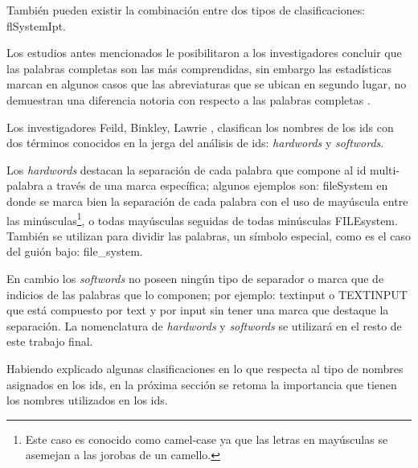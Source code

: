 También pueden existir la combinación entre dos tipos de clasificaciones: \textsf{flSystemIpt}.

Los estudios antes mencionados le posibilitaron a los investigadores concluir que las palabras completas son las más comprendidas, sin embargo las estadísticas marcan en algunos casos que las abreviaturas que se ubican en segundo lugar, no demuestran una diferencia notoria con respecto a las palabras completas \cite{DCHD06}.

Los investigadores Feild, Binkley, Lawrie \cite{FBL06,HDD06,DMDJ13}, clasifican los nombres de los ids con dos términos conocidos en la jerga del análisis de ids: \textit{hardwords} y \textit{softwords}.

Los \textit{hardwords} destacan la separación de cada palabra que compone al id multi-palabra a través de una marca específica; algunos ejemplos son: \mbox{\textsf{fileSystem}} en donde se marca bien la separación de cada palabra con el uso de mayúscula entre las minúsculas\footnote[1]{Este caso es conocido como camel-case ya que las letras en mayúsculas se asemejan a las jorobas de un camello.}, o todas mayúsculas seguidas de todas minúsculas \mbox{\textsf{FILEsystem}}. También se utilizan para dividir las palabras, un símbolo especial, como es el caso del guión bajo: \textsf{file\_system}. 

En cambio los \textit{softwords} no poseen ningún tipo de separador o marca que de indicios de las palabras que lo componen; por ejemplo: \textsf{textinput} o \mbox{\textsf{TEXTINPUT}} que está compuesto por \textsf{text} y por \textsf{input} sin tener una marca que destaque la separación.
La nomenclatura de \textit{hardwords} y \textit{softwords} se utilizará en el resto de este trabajo final. 

Habiendo explicado algunas clasificaciones en lo que respecta al tipo de nombres asignados en los ids, en la próxima sección se retoma la importancia que tienen los nombres utilizados en los ids.


